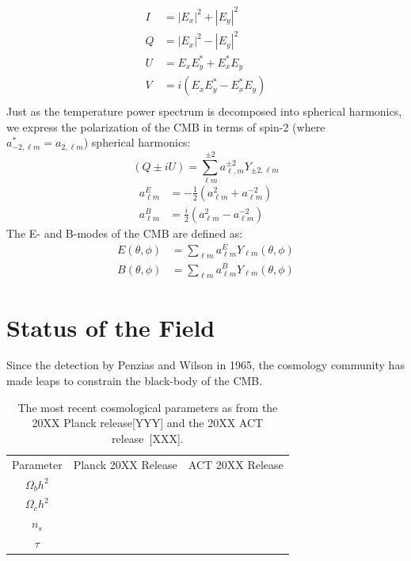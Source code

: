 \begin{equation}
\begin{split}
    I & = |E_x|^2 + |E_y|^2 \\
    Q & = |E_x|^2 - |E_y|^2 \\
    U & = E_x E_y^* + E_x^*E_y\\
    V & = i(E_x E_y^* - E_x^*E_y) \\
\end{split}
\label{eq:stokes}
\end{equation}
Just as the temperature power spectrum is decomposed into spherical harmonics, we express the polarization of the CMB in terms of spin-2 (where $a^*_{-2,\ell m} = a_{2,\ell m}$) spherical harmonics:
\begin{equation}
(Q \pm iU) = \sum_{\ell m}^{\pm 2} a^{\pm 2}_{\ell ,m} Y_{\pm2,\ell m}
\end{equation}
\begin{equation}
\begin{split}
    a_{\ell m }^E & = -\frac{1}{2}(a_{\ell m}^2 + a_{\ell m}^{-2}) \\
    a_{\ell m }^B & = \frac{i}{2}(a_{\ell m}^2 - a_{\ell m}^{-2})
\end{split}
\end{equation}
The E- and B-modes of the CMB are defined as:
\begin{equation}
\begin{split}
    E(\theta,\phi) & = \sum_{\ell m} a_{\ell m }^E Y_{\ell m}(\theta,\phi) \\
    B(\theta,\phi) & = \sum_{\ell m} a_{\ell m }^B Y_{\ell m}(\theta,\phi)
\end{split}
\end{equation}

\section{Status of the Field}
Since the detection by Penzias and Wilson in 1965, the cosmology community has made leaps to constrain the black-body of the CMB.  

\begin{table}[t]
    \centering
    \begin{tabular}{|c|c|c|}\hline 
         Parameter & Planck 20XX Release & ACT 20XX Release \\
         $\Omega_b h^2$ &  & \\
         $\Omega_c h^2$ &  & \\
         $n_s$ &  & \\
         $\tau$ &  & \\ \hline
    \end{tabular}
    \caption{The most recent cosmological parameters as from the 20XX Planck release[YYY] and the 20XX ACT release~[XXX].}
    \label{tab:cosmology_recent_results}
\end{table}

